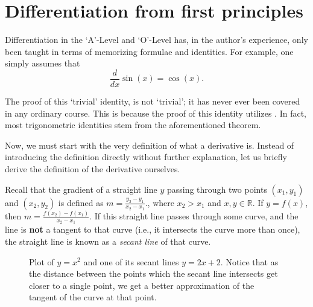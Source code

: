 \section{Differentiation from first principles}
Differentiation in the `A'-Level and `O'-Level has, in the author's experience, only been taught in terms of
memorizing formulae and identities. For example, one simply assumes that \[\frac{d}{dx}\sin(x) = \cos(x).\]

The proof of this `trivial' identity, is not `trivial'; it has never ever been covered in any
ordinary course. This is because the proof of this identity utilizes .
In fact, most trigonometric identities stem from the aforementioned theorem.

Now, we must start with the very definition of what a
derivative is. Instead of introducing the definition directly without further explanation, let us
briefly derive the definition of the derivative ourselves.

Recall that the gradient of a straight line $y$ passing through two points $(x_1, y_1)$ and $(x_2, y_2)$ is
defined as $m = \frac{y_2 - y_1}{x_2 - x_1}.$, where $x_2 > x_1$ and $x,y \in \mathbb{R}$.
If $y = f(x)$, then $m = \frac{f(x_2) - f(x_1)}{x_2 - x_1}.$ If this straight line passes through some curve,
and the line is \textbf{not} a tangent to that curve (i.e., it intersects the curve more than once),
the straight line is known as a \textit{secant line} of that curve.

\begin{figure}
    \centering
    \caption{
        Plot of $y = x^2$ and one of its secant lines $y = 2x + 2$.
        Notice that as the distance between the points which the secant line intersects get closer
        to a single point, we get a better approximation of the tangent of the curve at that point.
    }
    \label{fig:secantline}
\end{figure}

